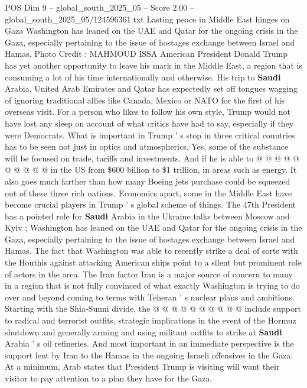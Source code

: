 \begin{textsample}{POS Dim 9 – global\_south\_2025\_05 – Score 2.00 – global\_south\_2025\_05/124596361.txt}  \label{ex:f9_pos_217}
Lasting peace in Middle East hinges on Gaza Washington has leaned on the UAE and Qatar for the ongoing crisis in the Gaza, especially pertaining to the issue of hostages exchange between Israel and Hamas.
Photo Credit : MAHMOUD ISSA American President Donald Trump has yet another opportunity to leave his mark in the Middle East, a region that is consuming a lot of his time internationally and otherwise.
His trip to \textbf{Saudi} Arabia, United Arab Emirates and Qatar has expectedly set off tongues wagging of ignoring traditional allies like Canada, Mexico or NATO for the first of his overseas visit.
For a person who likes to follow his own style, Trump would not have lost any sleep on account of what critics have had to say, especially if they were Democrats.
What is important in Trump ' s stop in three critical countries has to be seen not just in optics and atmospherics.
Yes, some of the substance will be focused on trade, tariffs and investments.
And if he is able to @ @ @ @ @ @ @ @ @ @ in the US from \$600 billion to \$1 trillion, in areas such as energy.
It also goes much farther than how many Boeing jets purchase could be squeezed out of these three rich nations.
Economics apart, some in the Middle East have become crucial players in Trump ' s global scheme of things.
The 47th President has a pointed role for \textbf{Saudi} Arabia in the Ukraine talks between Moscow and Kyiv ; Washington has leaned on the UAE and Qatar for the ongoing crisis in the Gaza, especially pertaining to the issue of hostages exchange between Israel and Hamas.
The fact that Washington was able to recently strike a deal of sorts with the Houthis against attacking American ships point to a silent but prominent role of actors in the area.
The Iran factor Iran is a major source of concern to many in a region that is not fully convinced of what exactly Washington is trying to do over and beyond coming to terms with Teheran ' s nuclear plans and ambitions.
Starting with the Shia-Sunni divide, the @ @ @ @ @ @ @ @ @ @ include support to radical and terrorist outfits, strategic implications in the event of the Hormuz shutdown and generally arming and using militant outfits to strike at \textbf{Saudi} Arabia ' s oil refineries.
And most important in an immediate perspective is the support lent by Iran to the Hamas in the ongoing Israeli offensives in the Gaza.
At a minimum, Arab states that President Trump is visiting will want their visitor to pay attention to a plan they have for the Gaza.

\end{textsample}
